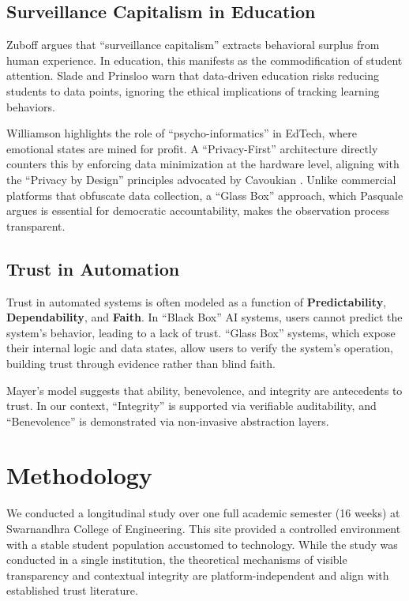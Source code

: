 \documentclass[conference]{IEEEtran}
\begin{document}
\subsection{Surveillance Capitalism in Education}
Zuboff \cite{b10} argues that ``surveillance capitalism'' extracts behavioral surplus from human experience. In education, this manifests as the commodification of student attention. Slade and Prinsloo \cite{b11} warn that data-driven education risks reducing students to data points, ignoring the ethical implications of tracking learning behaviors. 

Williamson \cite{b12} highlights the role of ``psycho-informatics'' in EdTech, where emotional states are mined for profit. A ``Privacy-First'' architecture directly counters this by enforcing data minimization at the hardware level, aligning with the ``Privacy by Design'' principles advocated by Cavoukian \cite{b13}. Unlike commercial platforms that obfuscate data collection, a ``Glass Box'' approach, which Pasquale \cite{b14} argues is essential for democratic accountability, makes the observation process transparent.

\subsection{Trust in Automation}
Trust in automated systems is often modeled as a function of \textbf{Predictability}, \textbf{Dependability}, and \textbf{Faith}. In ``Black Box'' AI systems, users cannot predict the system's behavior, leading to a lack of trust. ``Glass Box'' systems, which expose their internal logic and data states, allow users to verify the system's operation, building trust through evidence rather than blind faith.

Mayer's model \cite{b6} suggests that ability, benevolence, and integrity are antecedents to trust. In our context, ``Integrity'' is supported via verifiable auditability, and ``Benevolence'' is demonstrated via non-invasive abstraction layers.

\section{Methodology}

We conducted a longitudinal study over one full academic semester (16 weeks) at Swarnandhra College of Engineering. This site provided a controlled environment with a stable student population accustomed to technology. While the study was conducted in a single institution, the theoretical mechanisms of visible transparency and contextual integrity are platform-independent and align with established trust literature.
\end{document}

